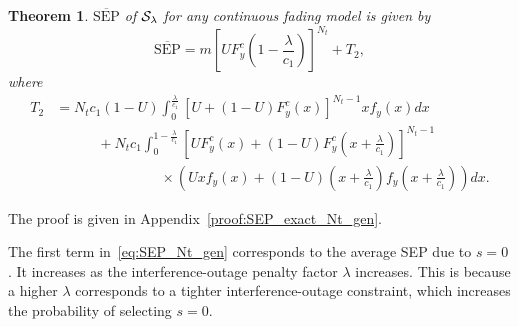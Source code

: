\documentclass[12pt,draftcls,peerreview,onecolumn]{IEEEtran}
\newtheorem{theorem}{{\bf Theorem}}
\newcommand{\SEP}{\text{SEP}}
\newcommand{\nx}{{0}}
\newcommand{\lam}{\lambda}
\newcommand{\termtwo}{T_2}
\newcommand{\Nt}{{N_t}}
\newcommand{\Nr}{{N_r}}
\newcommand{\cone}{c_{1}}
\newcommand{\ctwo}{c_{2}}
\newcommand{\m}{\cone}
\newcommand{\lambym}{\frac{\lam}{\m}}
\newcommand{\al}{\ctwo}
\newcommand{\snr}{\Omega}
\newcommand{\albysnr}[1][]{\frac{\al#1}{\snr}}
\newcommand{\un}{U}
\newcommand{\callamrule}{{\cal S_{{\lam}}}}
\newcommand{\avgSEP}{\overline{\SEP}}
\newcommand{\unccdfy}[2]{\frac{{#1}\,\,\gamma\left(\Nr,-\albysnr\ln{#2}\right)}{\Gamma\left(\Nr\right)}}
\newcommand{\ytimespdfyNr}{\left(\ln\left(\frac{1}{x}\right)\right)^{\Nr-1}x^{\albysnr[]}} %
\newcommand{\ypluslamtimespdfyNr}{\left(\ln\left(\frac{1}{x+\lambym}\right)\right)^{\Nr-1}\left(x+\lambym\right)^{\albysnr[]}} %
\newcommand{\pdfyNrgen}[1]{f_{y}\left(#1\right)} %
\newcommand{\ccdfy}[1]{F^{c}_{y}\left(#1 \right)}
\newcommand{\unccdfygen}[2]{{#1} \ccdfy{#2}  }
\begin{document}
\begin{theorem}
\label{thm:SEP_exact_Nt_gen}
$\avgSEP$ of $\callamrule$ for any continuous fading model is given by
\begin{equation}
\label{eq:SEP_Nt_gen} 
\avgSEP= m\left[\unccdfygen{\un}{1-\lambym}\right]^{\Nt} + \termtwo,
\end{equation}
%
where
\begin{align}
\label{eq:termtwo_gen}
\termtwo \!&= \Nt\m(1-\un)\int_{0}^{\lambym} \left[\un + \unccdfygen{(1-\un)}{x}\right]^{\Nt-1} x\pdfyNrgen{x} dx\nonumber\\
&\quad\quad\quad+ \Nt\m \int_{0}^{1-\lambym}
\left[\unccdfygen{\un}{x} +\unccdfygen{(1-\un)}{x+\lambym}  \right]^{\Nt-1}\nonumber\\
&\hspace{90pt}\times\left(\un x\pdfyNrgen{x} + (1-\un)\left(x + \lambym\right) \pdfyNrgen{x + \lambym}\right) dx.
\end{align}
%
\end{theorem}
%
\begin{IEEEproof}
The proof is given in Appendix~\ref{proof:SEP_exact_Nt_gen}.
\end{IEEEproof}
%

The first term in~\eqref{eq:SEP_Nt_gen} corresponds to the average SEP due to $s=\nx$. It increases as the interference-outage penalty factor $\lam$ increases. This is because a higher $\lam$ corresponds to a tighter interference-outage constraint, which increases the probability of selecting $s=\nx$. 
%
\end{document}

